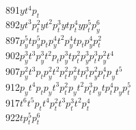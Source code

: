 \begin{tabbing}
891\>$y  t  ^4 p_t      $\\
892\>$y  t  ^3 p_t^2    $\>$y  t  ^2 p_t^3    $\>$y  t  p_t^4       $\>$y  p_t^5          $\>$p_y^6             $\\
897\>$p_y^5 t           $\>$p_y^5 p_t         $\>$p_y^4 t  ^2       $\>$p_y^4 t  p_t      $\>$p_y^4 p_t^2       $\\
902\>$p_y^3 t  ^3       $\>$p_y^3 t  ^2 p_t   $\>$p_y^3 t  p_t^2    $\>$p_y^3 p_t^3       $\>$p_y^2 t  ^4       $\\
907\>$p_y^2 t  ^3 p_t   $\>$p_y^2 t  ^2 p_t^2 $\>$p_y^2 t  p_t^3    $\>$p_y^2 p_t^4       $\>$p_yt  ^5          $\\
912\>$p_yt  ^4 p_t      $\>$p_yt  ^3 p_t^2    $\>$p_yt  ^2 p_t^3    $\>$p_yt  p_t^4       $\>$p_yp_t^5          $\\
917\>$t  ^6             $\>$t  ^5 p_t         $\>$t  ^4 p_t^2       $\>$t  ^3 p_t^3       $\>$t  ^2 p_t^4       $\\
922\>$t  p_t^5          $\>$p_t^6             $
\end{tabbing}


